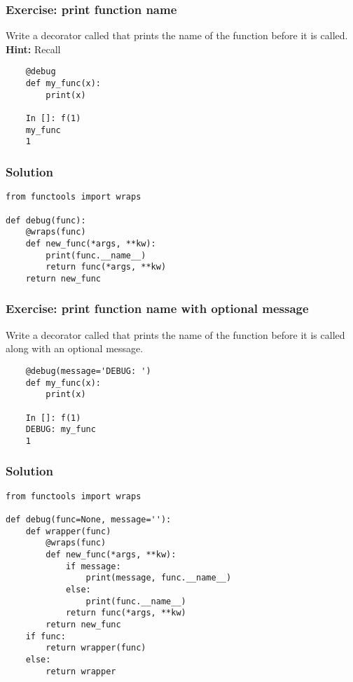 \documentclass[14pt,compress,aspectratio=169]{beamer}
\begin{document}
\begin{frame}
  \frametitle{Exercise: print function name}
  \begin{block}{}
    Write a decorator called  that prints the name of the function
    before it is called.  \textbf{Hint:} Recall 
  \end{block}

\begin{lstlisting}
    @debug
    def my_func(x):
        print(x)

    In []: f(1)
    my_func
    1
\end{lstlisting}
\end{frame}


\begin{frame}
  \frametitle{Solution}
\begin{lstlisting}
from functools import wraps

def debug(func):
    @wraps(func)
    def new_func(*args, **kw):
        print(func.__name__)
        return func(*args, **kw)
    return new_func
\end{lstlisting}
\end{frame}


\begin{frame}
  \frametitle{Exercise: print function name with optional message}
  \begin{block}{}
    Write a decorator called  that prints the name of
    the function before it is called along with an optional message.
  \end{block}

\begin{lstlisting}
    @debug(message='DEBUG: ')
    def my_func(x):
        print(x)

    In []: f(1)
    DEBUG: my_func
    1
\end{lstlisting}
\end{frame}


\begin{frame}
  \frametitle{Solution}
  \vspace*{-0.1in}
  \small
\begin{lstlisting}
from functools import wraps

def debug(func=None, message=''):
    def wrapper(func)
        @wraps(func)
        def new_func(*args, **kw):
            if message:
                print(message, func.__name__)
            else:
                print(func.__name__)
            return func(*args, **kw)
        return new_func
    if func:
        return wrapper(func)
    else:
        return wrapper
\end{lstlisting}
\end{frame}
\end{document}
